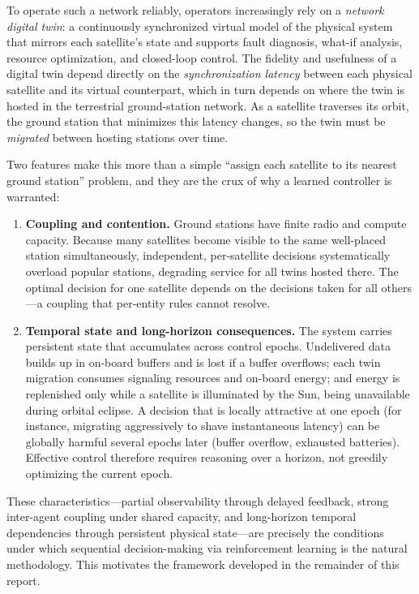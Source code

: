 \documentclass[11pt]{article}
\begin{document}
To operate such a network reliably, operators increasingly rely on a
\emph{network digital twin}: a continuously synchronized virtual model of the
physical system that mirrors each satellite's state and supports fault diagnosis,
what-if analysis, resource optimization, and closed-loop control. The fidelity and
usefulness of a digital twin depend directly on the \emph{synchronization latency}
between each physical satellite and its virtual counterpart, which in turn depends
on where the twin is hosted in the terrestrial ground-station network. As a
satellite traverses its orbit, the ground station that minimizes this latency
changes, so the twin must be \emph{migrated} between hosting stations over time.

Two features make this more than a simple ``assign each satellite to its nearest
ground station'' problem, and they are the crux of why a learned controller is
warranted:

\begin{enumerate}[leftmargin=*]
  \item \textbf{Coupling and contention.} Ground stations have finite radio and
  compute capacity. Because many satellites become visible to the same
  well-placed station simultaneously, independent, per-satellite decisions
  systematically overload popular stations, degrading service for all twins
  hosted there. The optimal decision for one satellite depends on the decisions
  taken for all others---a coupling that per-entity rules cannot resolve.

  \item \textbf{Temporal state and long-horizon consequences.} The system carries
  persistent state that accumulates across control epochs. Undelivered data
  builds up in on-board buffers and is lost if a buffer overflows; each twin
  migration consumes signaling resources and on-board energy; and energy is
  replenished only while a satellite is illuminated by the Sun, being unavailable
  during orbital eclipse. A decision that is locally attractive at one epoch (for
  instance, migrating aggressively to shave instantaneous latency) can be
  globally harmful several epochs later (buffer overflow, exhausted batteries).
  Effective control therefore requires reasoning over a horizon, not greedily
  optimizing the current epoch.
\end{enumerate}

These characteristics---partial observability through delayed feedback, strong
inter-agent coupling under shared capacity, and long-horizon temporal
dependencies through persistent physical state---are precisely the conditions
under which sequential decision-making via reinforcement learning is the natural
methodology. This motivates the framework developed in the remainder of this
report.
\end{document}

